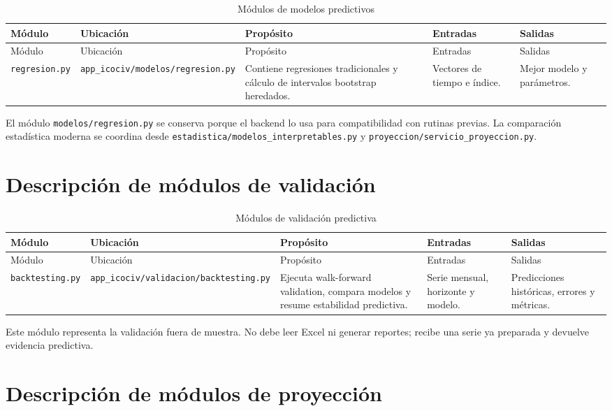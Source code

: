 \documentclass[12pt,letterpaper]{article}
\begin{document}
\begin{longtable}{p{}p{}p{}p{}p{}}
\caption{Módulos de modelos predictivos}
\label{tab:modulos_modelos}\\
\toprule
Módulo & Ubicación & Propósito & Entradas & Salidas \\
\midrule
\endfirsthead
\toprule
Módulo & Ubicación & Propósito & Entradas & Salidas \\
\midrule
\endhead
\texttt{regresion.py} & \texttt{app\_icociv/modelos/regresion.py} & Contiene regresiones tradicionales y cálculo de intervalos bootstrap heredados. & Vectores de tiempo e índice. & Mejor modelo y parámetros. \\
\bottomrule
\end{longtable}

El módulo \texttt{modelos/regresion.py} se conserva porque el backend lo usa para compatibilidad con rutinas previas. La comparación estadística moderna se coordina desde \texttt{estadistica/modelos\_interpretables.py} y \texttt{proyeccion/servicio\_proyeccion.py}.

\section{Descripción de módulos de validación}

\begin{longtable}{p{}p{}p{}p{}p{}}
\caption{Módulos de validación predictiva}
\label{tab:modulos_validacion}\\
\toprule
Módulo & Ubicación & Propósito & Entradas & Salidas \\
\midrule
\endfirsthead
\toprule
Módulo & Ubicación & Propósito & Entradas & Salidas \\
\midrule
\endhead
\texttt{backtesting.py} & \texttt{app\_icociv/validacion/backtesting.py} & Ejecuta walk-forward validation, compara modelos y resume estabilidad predictiva. & Serie mensual, horizonte y modelo. & Predicciones históricas, errores y métricas. \\
\bottomrule
\end{longtable}

Este módulo representa la validación fuera de muestra. No debe leer Excel ni generar reportes; recibe una serie ya preparada y devuelve evidencia predictiva.

\section{Descripción de módulos de proyección}
\end{document}
